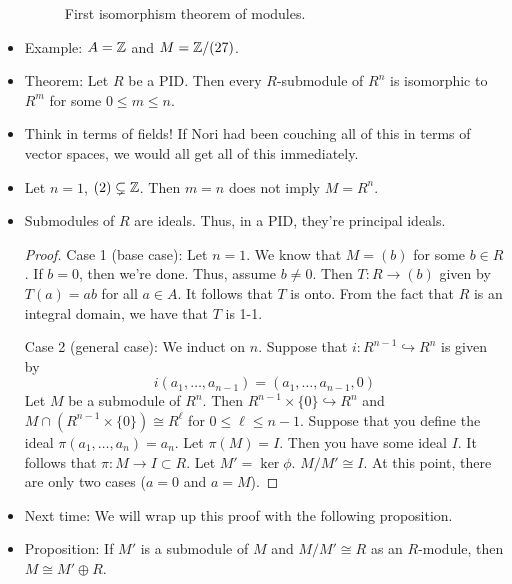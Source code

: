 \documentclass[../notes.tex]{subfiles}
\begin{document}
\begin{itemize}
\begin{figure}[H]
        \caption{First isomorphism theorem of modules.}
        \label{fig:FITModule}
    \end{figure}
    \item Example: $A=\mathbb{Z}$ and $M=\mathbb{Z}/(27)$.
    \item Theorem: Let $R$ be a PID. Then every $R$-submodule of $R^n$ is isomorphic to $R^m$ for some $0\leq m\leq n$.
    \item Think in terms of fields! If Nori had been couching all of this in terms of vector spaces, we would all get all of this immediately.
    \item Let $n=1$, $(2)\subsetneq\mathbb{Z}$. Then $m=n$ does not imply $M=R^n$.
    \item Submodules of $R$ are ideals. Thus, in a PID, they're principal ideals.
    \begin{proof}
        Case 1 (base case): Let $n=1$. We know that $M=(b)$ for some $b\in R$. If $b=0$, then we're done. Thus, assume $b\neq 0$. Then $T:R\to(b)$ given by $T(a)=ab$ for all $a\in A$. It follows that $T$ is onto. From the fact that $R$ is an integral domain, we have that $T$ is 1-1.\par
        Case 2 (general case): We induct on $n$. Suppose that $i:R^{n-1}\hookrightarrow R^n$ is given by
        \begin{equation*}
            i(a_1,\dots,a_{n-1}) = (a_1,\dots,a_{n-1},0)
        \end{equation*}
        Let $M$ be a submodule of $R^n$. Then $R^{n-1}\times\{0\}\hookrightarrow R^n$ and $M\cap(R^{n-1}\times\{0\})\cong R^\ell$ for $0\leq\ell\leq n-1$. Suppose that you define the ideal $\pi(a_1,\dots,a_n)=a_n$. Let $\pi(M)=I$. Then you have some ideal $I$. It follows that $\pi:M\to I\subset R$. Let $M'=\ker\phi$. $M/M'\cong I$. At this point, there are only two cases ($a=0$ and $a=M$).
    \end{proof}
    \item Next time: We will wrap up this proof with the following proposition.
    \item Proposition: If $M'$ is a submodule of $M$ and $M/M'\cong R$ as an $R$-module, then $M\cong M'\oplus R$.
\end{itemize}
\end{document}
